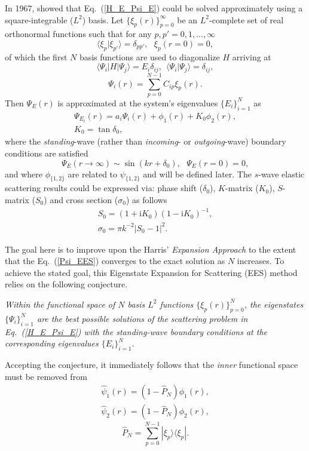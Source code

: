 \documentclass[aip
, pra
, showpacs
, aps
, twocolumn
, groupedaddress
, floatfix
]{revtex4}
\newcommand{\beq}{\begin{equation}}
\newcommand{\eeq}{\end{equation}}
\newcommand{\barr}{\begin{array}}
\newcommand{\earr}{\end{array}}
\begin{document}
In 1967, \citet{Harris67} showed that Eq.~(\ref{H_E_Psi_E}) could be solved
approximately using a square-integrable ($L^2$) basis.
Let $\{\xi_p(r)\}_{p=0}^\infty$ be an $L^2$-complete set of real orthonormal functions
such that for any $p,p'=0,1,...,\infty$
\beq
\langle \xi_p | \xi_{p'} \rangle=\delta_{pp'}, \ \ \ \xi_p(r=0)=0,
\eeq
of which the first $N$ basis functions are used to diagonalize $H$ arriving at
\beq
\langle \Psi_i |H| \Psi_j \rangle = E_i \delta_{ij} , \ \ \langle \Psi_i | \Psi_j \rangle=\delta_{ij},
\eeq
\beq
\Psi_i(r) = \sum_{p=0}^{N-1} C_{ip} \xi_p(r).
\eeq
Then $\Psi_E(r)$ is approximated at the system's eigenvalues $\{E_i\}_{i=1}^{N}$ as
\cite{Harris67}
\beq \barr{l}
\Psi_{E_i}(r) = a_i \Psi_i(r)  + \phi_1(r)  + K_0 \phi_2(r),\\
K_0 = \tan{\delta_0}, 
\earr \label{Psi_EES} \eeq
where the {\em standing}-wave (rather than {\em incoming}- or {\em outgoing}-wave) boundary conditions are satisfied
\beq
\Psi_E(r \rightarrow \infty) \sim \sin(kr+\delta_0), \ \ \ \Psi_E(r= 0)=0,
\eeq
and where $\phi_{\{1,2\}}$ are related to $\psi_{\{1,2\}}$ and will be defined later.
The $s$-wave elastic scattering results could be expressed via:
phase shift ($\delta_0$), $K$-matrix ($K_0$), $S$-matrix ($S_{0}$) and cross section ($\sigma_{0}$)
as follows
\beq \barr{l}
S_{0}=(1+\mbox{i}K_0)(1-\mbox{i}K_0)^{-1}, \\
\sigma_{0}=\pi k^{-2} |S_{0}-1|^2.
\earr \eeq


The goal here is to improve upon the Harris' {\em Expansion Approach} \cite{Harris67} to the extent that the Eq.~(\ref{Psi_EES})
converges to the exact solution as $N$ increases.
To achieve the stated goal, this Eigenstate Expansion for Scattering (EES) method relies on the following conjecture.


{\em Within the functional space of $N$ basis $L^2$ functions  $\{\xi_p(r)\}_{p=0}^N$,
the eigenstates $\{\Psi_i\}_{i=1}^{N}$ are the best possible solutions of the scattering problem in Eq.~(\ref{H_E_Psi_E})
with the standing-wave boundary conditions at the corresponding eigenvalues $\{E_i\}_{i=1}^{N}$.
}


Accepting the conjecture, it immediately follows that the {\em inner} functional space must be removed from
\beq \barr{l}
\hat{\psi}_1(r) = (1-\hat{P}_N) \phi_1(r),\\
\hat{\psi}_2(r) = (1-\hat{P}_N) \phi_2(r),
\earr \eeq
\beq
\hat{P}_N = \sum_{p=0}^{N-1} | \xi_p \rangle \langle \xi_p |.
\eeq
\end{document}
